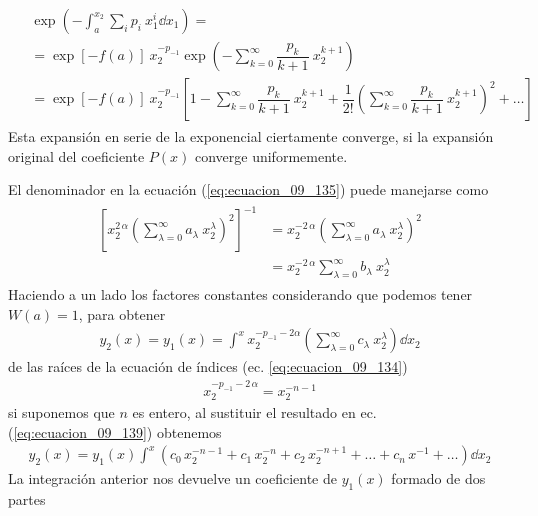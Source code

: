 \begin{align}
\begin{aligned}
&{}\exp \left( - \int_{a}^{x_{2}} \sum_{i} p_{i} \: x_{1}^{i} \dd{x_{1}} \right) =  \\
&= \exp [ - f(a) ] \: x_{2}^{-p_{-1}} \exp \left( - \sum_{k=0}^{\infty} \dfrac{p_{k}}{k+1} \: x_{2}^{k+1} \right)  \\
&= \exp [ - f(a) ] \: x_{2}^{-p_{-1}} \left[ 1 - \sum_{k=0}^{\infty} \dfrac{p_{k}}{k+1} \: x_{2}^{k+1} + \dfrac{1}{2!} \left( \sum_{k=0}^{\infty} \dfrac{p_{k}}{k+1} \: x_{2}^{k+1} \right)^{2} + \ldots \right]
\end{aligned}
\label{eq:ecuacion_09_137}
\end{align}
Esta expansión en serie de la exponencial ciertamente converge, si la expansión original del coeficiente $P(x)$ converge uniformemente.
\par
El denominador en la ecuación (\ref{eq:ecuacion_09_135}) puede manejarse como
\begin{align}
\begin{aligned}
\left[ x_{2}^{2 \, \alpha} \left( \sum_{\lambda=0}^{\infty} a_{\lambda} \: x_{2}^{\lambda} \right)^{2} \right]^{-1} &= x_{2}^{-2 \, \alpha} \left( \sum_{\lambda=0}^{\infty} a_{\lambda} \: x_{2}^{\lambda} \right)^{2}  \\
&= x_{2}^{-2 \, \alpha} \sum_{\lambda=0}^{\infty} b_{\lambda} \: x_{2}^{\lambda}
\end{aligned}
\label{eq:ecuacion_09_138}
\end{align}
Haciendo a un lado los factores constantes considerando que podemos tener $W(a) = 1$, para obtener
\begin{align}
y_{2}(x) =  y_{1}(x) = \int^{x} x_{2}^{-p_{-1}-2 \alpha} \left( \sum_{\lambda=0}^{\infty} c_{\lambda} \: x_{2}^{\lambda} \right) \dd{x_{2}} 
\label{eq:ecuacion_09_139}
\end{align}
de las raíces de la ecuación de índices (ec. \ref{eq:ecuacion_09_134})
\begin{align}
x_{2}^{-p_{-1} - 2 \, \alpha} = x_{2}^{-n-1}
\end{align}
si suponemos que $n$ es entero, al sustituir el resultado en ec. (\ref{eq:ecuacion_09_139}) obtenemos 
\begin{align}
y_{2}(x) = y_{1}(x) \int^{x} (c_{0} \, x_{2}^{-n-1} + c_{1} \, x_{2}^{-n} + c_{2} \, x_{2}^{-n+1} + \ldots + c_{n} \, x^{-1} + \ldots ) \dd{x_{2}}
\label{eq:ecuacion_09_141}
\end{align}
La integración anterior nos devuelve un coeficiente de $y_{1}(x)$ formado de dos partes
